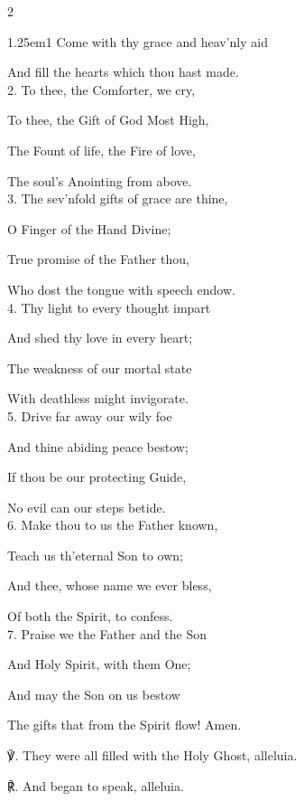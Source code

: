 \begin{multicols}{2}

\begin{hangparas}{1.25em}{1}
Come with thy grace and heav'nly aid

And fill the hearts which thou hast made.\\

2. To thee, the Comforter, we cry,

To thee, the Gift of God Most High,

The Fount of life, the Fire of love,

The soul's Anointing from above.\\

3. The sev'nfold gifts of grace are thine,

O Finger of the Hand Divine;

True promise of the Father thou,

Who dost the tongue with speech endow.\\

4. Thy light to every thought impart

And shed thy love in every heart;

The weakness of our mortal state

With deathless might invigorate.\\

5. Drive far away our wily foe

And thine abiding peace bestow;

If thou be our protecting Guide,

No evil can our steps betide.\\

6. Make thou to us the Father known,

Teach us th'eternal Son to own;

And thee, whose name we ever bless,

Of both the Spirit, to confess.\\

7. Praise we the Father and the Son

And Holy Spirit, with them One;

And may the Son on us bestow

The gifts that from the Spirit flow! Amen.\\
\end{hangparas}

℣. They were all filled with the Holy Ghost, alleluia.

℟. And began to speak, alleluia.

\end{multicols}

